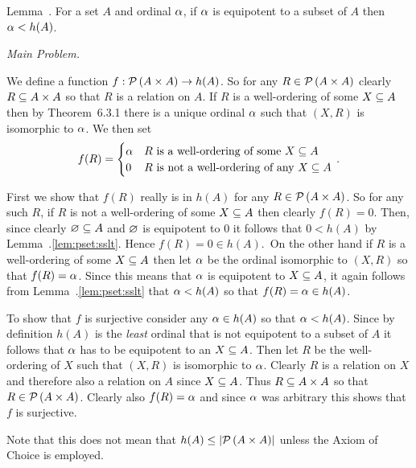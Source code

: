 \begin{solution}
    \begin{statement}{Lemma~\ex.}
        For a set $A$ and ordinal $\a$, if $\a$ is equipotent to a subset of $A$ then $\a < h(A)$.
    \end{statement}


    \emph{Main Problem.}

	We define a function $f : \pset{A \times A} \to h(A)$.
    So for any $R \in \pset{A \times A}$ clearly $R \ss A \times A$ so that $R$ is a relation on $A$.
    If $R$ is a well-ordering of some $X \ss A$ then by Theorem~6.3.1 there is a unique ordinal $\a$ such that $(X, R)$ is isomorphic to $\a$.
    We then set
    $$
    f(R) = \begin{cases}
         \a & \text{$R$ is a well-ordering of some $X \ss A$} \\
         0 & \text{$R$ is not a well-ordering of any $X \ss A$} \\
    \end{cases} \,.
    $$

    First we show that $f(R)$ really is in $h(A)$ for any $R \in \pset{A \times A}$.
    So for any such $R$, if $R$ is not a well-ordering of some $X \ss A$ then clearly $f(R) = 0$.
    Then, since clearly $\es \ss A$ and $\es$ is equipotent to 0 it follows that $0 < h(A)$ by Lemma~\ex.\ref{lem:pset:sslt}.
    Hence $f(R) = 0 \in h(A)$.\
    On the other hand if $R$ is a well-ordering of some $X \ss A$ then let $\a$ be the ordinal isomorphic to $(X,R)$ so that $f(R) = \a$.
    Since this means that $\a$ is equipotent to $X \ss A$, it again follows from Lemma~\ex.\ref{lem:pset:sslt} that $\a < h(A)$ so that $f(R) = \a \in h(A)$.

    To show that $f$ is surjective consider any $\a \in h(A)$ so that $\a < h(A)$.
    Since by definition $h(A)$ is the \emph{least} ordinal that is not equipotent to a subset of $A$ it follows that $\a$ has to be equipotent to an $X \ss A$.
    Then let $R$ be the well-ordering of $X$ such that $(X,R)$ is isomorphic to $\a$.
    Clearly $R$ is a relation on $X$ and therefore also a relation on $A$ since $X \ss A$.
    Thus $R \ss A \times A$ so that $R \in \pset{A \times A}$.
    Clearly also $f(R) = \a$ and since $\a$ was arbitrary this shows that $f$ is surjective. \qedsymbol

    Note that this does not mean that $h(A) \leq \abs{\pset{A \times A}}$ unless the Axiom of Choice is employed.
\end{solution}

